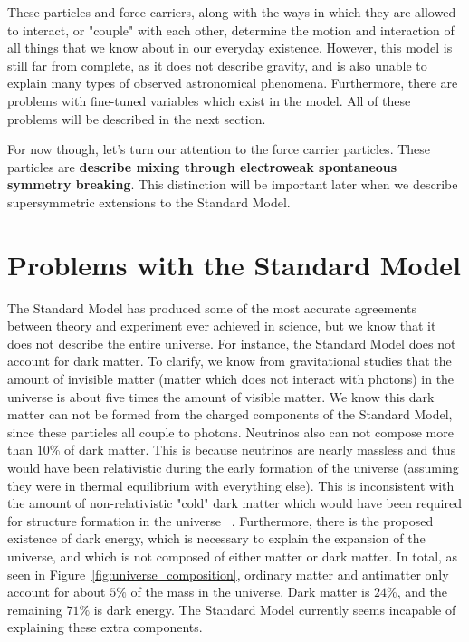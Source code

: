 These particles and force carriers, along with the ways in which they are allowed to interact, or "couple" with each other, determine the motion and interaction of all things that we know about in our everyday existence. However, this model is still far from complete, as it does not describe gravity, and is also unable to explain many types of observed astronomical phenomena. Furthermore, there are problems with fine-tuned variables which exist in the model. All of these problems will be described in the next section.

For now though, let's turn our attention to the force carrier particles. These particles are \textbf{describe mixing through electroweak spontaneous symmetry breaking}. This distinction will be important later when we describe supersymmetric extensions to the Standard Model.

\section{Problems with the Standard Model}

The Standard Model has produced some of the most accurate agreements between theory and experiment ever achieved in science, but we know that it does not describe the entire universe. For instance, the Standard Model does not account for dark matter. To clarify, we know from gravitational studies that the amount of invisible matter (matter which does not interact with photons) in the universe is about five times the amount of visible matter. We know this dark matter can not be formed from the charged components of the Standard Model, since these particles all couple to photons. Neutrinos also can not compose more than $10\%$ of dark matter. This is because neutrinos are nearly massless and thus would have been relativistic during the early formation of the universe (assuming they were in thermal equilibrium with everything else). This is inconsistent with the amount of non-relativistic "cold" dark matter which would have been required for structure formation in the universe ~\cite{structure_formation}. Furthermore, there is the proposed existence of dark energy, which is necessary to explain the expansion of the universe, and which is not composed of either matter or dark matter. In total, as seen in Figure~\ref{fig:universe_composition}, ordinary matter and antimatter only account for about $5\%$ of the mass in the universe. Dark matter is $24\%$, and the remaining $71\%$ is dark energy. The Standard Model currently seems incapable of explaining these extra components.

